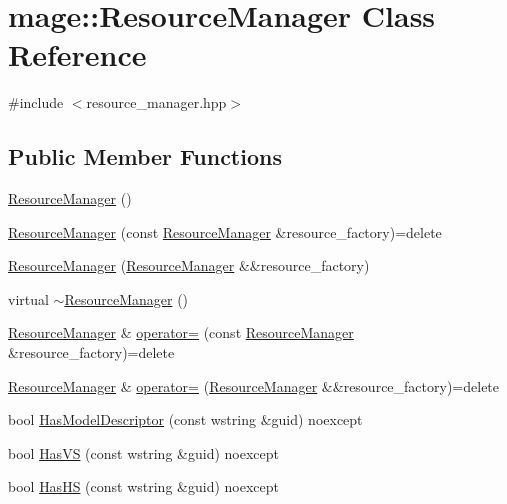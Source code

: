 \hypertarget{classmage_1_1_resource_manager}{}\section{mage\+:\+:Resource\+Manager Class Reference}
\label{classmage_1_1_resource_manager}


{\ttfamily \#include $<$resource\+\_\+manager.\+hpp$>$}

\subsection*{Public Member Functions}
\begin{DoxyCompactItemize}
\item 
\hyperlink{classmage_1_1_resource_manager_a0ff509899a9fbef2096c60b3d3d80bd5}{Resource\+Manager} ()
\item 
\hyperlink{classmage_1_1_resource_manager_a7d61b10f18bb0ea34bc2a1e9920eeb3d}{Resource\+Manager} (const \hyperlink{classmage_1_1_resource_manager}{Resource\+Manager} \&resource\+\_\+factory)=delete
\item 
\hyperlink{classmage_1_1_resource_manager_a7aa3b08f3edd385b48694ae4b301ebba}{Resource\+Manager} (\hyperlink{classmage_1_1_resource_manager}{Resource\+Manager} \&\&resource\+\_\+factory)
\item 
virtual \hyperlink{classmage_1_1_resource_manager_ad4bed85d3656f90072c5d47f50618add}{$\sim$\+Resource\+Manager} ()
\item 
\hyperlink{classmage_1_1_resource_manager}{Resource\+Manager} \& \hyperlink{classmage_1_1_resource_manager_a20dccd5bdf541990ec4db7819adc6cdb}{operator=} (const \hyperlink{classmage_1_1_resource_manager}{Resource\+Manager} \&resource\+\_\+factory)=delete
\item 
\hyperlink{classmage_1_1_resource_manager}{Resource\+Manager} \& \hyperlink{classmage_1_1_resource_manager_a0a418c5753af2b4a0a868801f3145f0a}{operator=} (\hyperlink{classmage_1_1_resource_manager}{Resource\+Manager} \&\&resource\+\_\+factory)=delete
\item 
bool \hyperlink{classmage_1_1_resource_manager_a20913b24e2b86b3c59887f6b071bb020}{Has\+Model\+Descriptor} (const wstring \&guid) noexcept
\item 
bool \hyperlink{classmage_1_1_resource_manager_ae1245536ca2c0486697b95c89ad3ac44}{Has\+VS} (const wstring \&guid) noexcept
\item 
bool \hyperlink{classmage_1_1_resource_manager_a9283ce235899255af209d3166cd67efc}{Has\+HS} (const wstring \&guid) noexcept

\end{DoxyCompactItemize}
